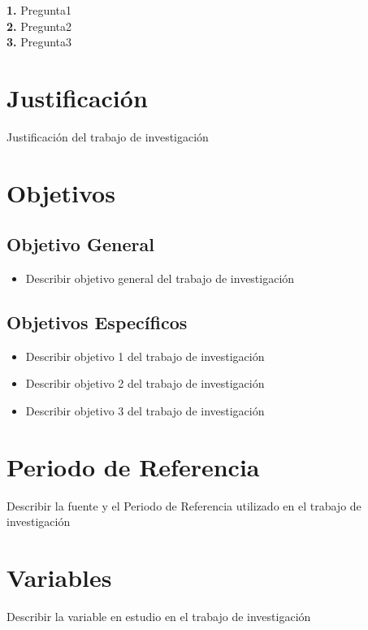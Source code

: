 \documentclass[oneside,11pt]{Latex/Classes/PhDthesisPSnPDF}
\begin{document}
\textbf{1.} Pregunta1\\

\textbf{2.} Pregunta2\\

\textbf{3.} Pregunta3\\

\section{Justificación}

Justificación del trabajo de investigación\\

\section{Objetivos}

\subsection{Objetivo General}
\begin{itemize}
  \item{Describir objetivo general del trabajo de investigación}
\end{itemize}

\subsection{Objetivos Específicos}
\begin{itemize}
  \item{Describir objetivo 1 del trabajo de investigación}
  \item{Describir objetivo 2 del trabajo de investigación}
  \item{Describir objetivo 3 del trabajo de investigación}
\end{itemize}

\section{Periodo de Referencia}

Describir la fuente y el Periodo de Referencia utilizado en el trabajo
de investigación

\section{Variables}

Describir la variable en estudio en el trabajo de investigación
\end{document}
